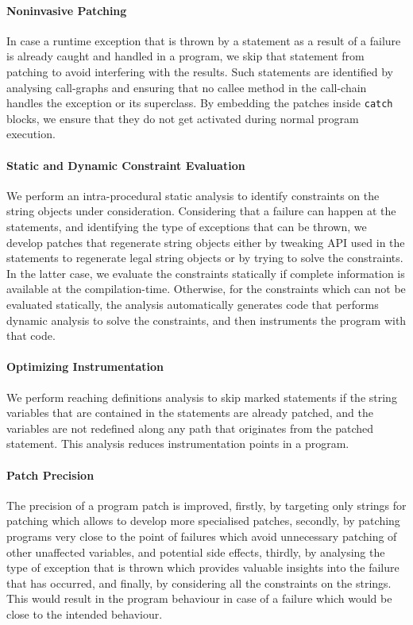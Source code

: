 \paragraph{Noninvasive Patching} In case a runtime exception that is thrown
by a statement as a result of a failure is already caught and handled in a program,
we skip that statement from patching to avoid interfering with the results. Such
statements are identified by analysing call-graphs and ensuring that no callee method
in the call-chain handles the exception or its superclass. By embedding the patches inside
\texttt{catch} blocks, we ensure that they do not get activated during normal program execution.

\paragraph{Static and Dynamic Constraint Evaluation} We perform an intra-procedural static analysis
to identify constraints on the string objects under consideration. Considering that a failure can happen
at the statements, and identifying the type of exceptions that can be thrown, we develop patches that
regenerate string objects either by tweaking \java{} API used in
the statements to regenerate legal string objects or by trying to solve the constraints. In the latter case,
we evaluate the constraints statically if complete information is available at the compilation-time.
Otherwise, for the constraints which can not be evaluated statically, the analysis automatically generates
code that performs dynamic analysis to solve the constraints, and then instruments the program with that code.

\paragraph{Optimizing Instrumentation} We perform reaching definitions analysis to skip marked statements
if the string variables that are contained in the statements are already patched, and the variables
are not redefined along any path that originates from the patched statement. This analysis reduces
instrumentation points in a program.

\paragraph{Patch Precision} The precision of a program patch is improved, firstly, by targeting only strings
for patching which allows to develop more specialised patches, secondly, by patching programs very
close to the point of failures which avoid unnecessary patching of other unaffected variables, and potential
side effects, thirdly, by analysing the type of exception that is thrown which provides valuable insights into
the failure that has occurred, and finally, by considering all the constraints on the strings. This would result
in the program behaviour in case of a failure which would be close to the intended behaviour.

